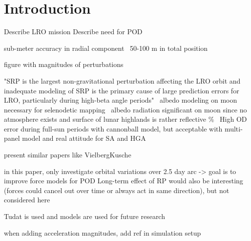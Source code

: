 \section{Introduction}
\label{sec:introduction}

Describe LRO mission
Describe need for POD

sub-meter accuracy in radial component~\cite{Zuber2009}
50-100 m in total position~\cite{Chin2007}

figure with magnitudes of perturbations

"SRP is the largest non-gravitational perturbation affecting the LRO orbit and inadequate modeling of SRP is the primary cause of large prediction errors for LRO, particularly during high-beta angle periods"~\cite{Slojkowski2015}
albedo modeling on moon necessary for selenodetic mapping~\cite{Floberghagen1999}
albedo radiation significant on moon since no atmosphere exists and surface of lunar highlands is rather reflective \%~\cite{Floberghagen1999}
High OD error during full-sun periods with cannonball model, but acceptable with multi-panel model and real attitude for SA and HGA~\cite[]{Slojkowski2014}

present similar papers like VielbergKusche

in this paper, only investigate orbital variations over 2.5 day arc -> goal is to improve force models for POD
Long-term effect of RP would also be interesting (forces could cancel out over time or always act in same direction), but not considered here

\gls{Tudat} is used and models are used for future research


when adding acceleration magnitudes, add ref in simulation setup
